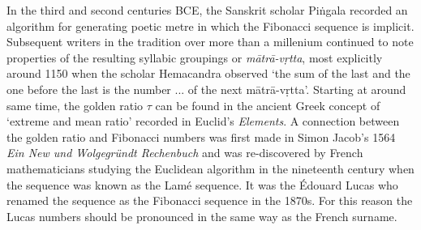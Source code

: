 \documentclass{svmono}
\begin{document}
In the third and second centuries BCE, the Sanskrit scholar Piṅgala recorded an algorithm for generating poetic metre in which the Fibonacci sequence is implicit. Subsequent writers in the tradition over more than a millenium continued to note properties of the resulting syllabic groupings or \textit{mātrā-vṛtta}, most explicitly around 1150 when the scholar Hemacandra observed `the sum of the last and the one before the last is the number ... of the next mātrā-vṛtta'. 
Starting at around same time, the golden ratio $\tau$ can be found in the ancient Greek concept of `extreme and mean ratio' recorded in Euclid's \textit{Elements}. 
A connection between the golden ratio and Fibonacci numbers was first made in Simon Jacob's 1564 \textit{Ein New und Wolgegründt Rechenbuch} and was  re-discovered by French mathematicians studying the Euclidean algorithm in the nineteenth century when the sequence was known as the Lamé sequence. It was the Édouard Lucas who renamed the sequence as the Fibonacci sequence in the 1870s. For this reason the Lucas numbers should be pronounced in the same way as the French surname.
\end{document}
